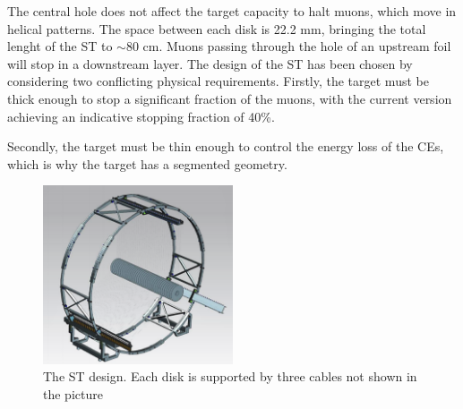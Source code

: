 The central hole does not affect the target capacity to halt muons, 
which move in helical patterns. The space between each disk is
22.2 mm, bringing the total lenght of the ST to $\sim$80 cm.
Muons passing through the hole of an upstream foil will stop in a downstream layer. 
The design of the ST has been chosen by considering two 
conflicting physical requirements. Firstly, the target must be thick enough 
to stop a significant fraction of the muons, with the current version achieving 
{\red an indicative stopping fraction of 40\%.}


Secondly, the target must be thin 
enough to control the energy loss of the CEs, which is why 
the target has a segmented geometry.
\begin{figure}[!h]
    \centering
    \includegraphics[width =0.5\textwidth]{figures/png/Screenshot_20240706_122723.png}
    \caption[The Stopping Target design.]{The ST design. 
    Each disk is supported by three cables not shown in the picture }
    \label{fig:ST}
\end{figure}

